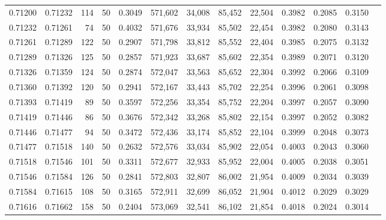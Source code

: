 \begin{tabular}{rrrrrrrrrrrrr}
0.71200 & 0.71232 &   114 &  50 &                                     0.3049 & 571,602 &  34,008 &  85,452 &  22,504 & 0.3982 & 0.2085 & 0.3150 \\
0.71232 & 0.71261 &    74 &  50 &                                     0.4032 & 571,676 &  33,934 &  85,502 &  22,454 & 0.3982 & 0.2080 & 0.3143 \\
0.71261 & 0.71289 &   122 &  50 &                                     0.2907 & 571,798 &  33,812 &  85,552 &  22,404 & 0.3985 & 0.2075 & 0.3132 \\
0.71289 & 0.71326 &   125 &  50 &                                     0.2857 & 571,923 &  33,687 &  85,602 &  22,354 & 0.3989 & 0.2071 & 0.3120 \\
0.71326 & 0.71359 &   124 &  50 &                                     0.2874 & 572,047 &  33,563 &  85,652 &  22,304 & 0.3992 & 0.2066 & 0.3109 \\
0.71360 & 0.71392 &   120 &  50 &                                     0.2941 & 572,167 &  33,443 &  85,702 &  22,254 & 0.3996 & 0.2061 & 0.3098 \\
0.71393 & 0.71419 &    89 &  50 &                                     0.3597 & 572,256 &  33,354 &  85,752 &  22,204 & 0.3997 & 0.2057 & 0.3090 \\
0.71419 & 0.71446 &    86 &  50 &                                     0.3676 & 572,342 &  33,268 &  85,802 &  22,154 & 0.3997 & 0.2052 & 0.3082 \\
0.71446 & 0.71477 &    94 &  50 &                                     0.3472 & 572,436 &  33,174 &  85,852 &  22,104 & 0.3999 & 0.2048 & 0.3073 \\
0.71477 & 0.71518 &   140 &  50 &                                     0.2632 & 572,576 &  33,034 &  85,902 &  22,054 & 0.4003 & 0.2043 & 0.3060 \\
0.71518 & 0.71546 &   101 &  50 &                                     0.3311 & 572,677 &  32,933 &  85,952 &  22,004 & 0.4005 & 0.2038 & 0.3051 \\
0.71546 & 0.71584 &   126 &  50 &                                     0.2841 & 572,803 &  32,807 &  86,002 &  21,954 & 0.4009 & 0.2034 & 0.3039 \\
0.71584 & 0.71615 &   108 &  50 &                                     0.3165 & 572,911 &  32,699 &  86,052 &  21,904 & 0.4012 & 0.2029 & 0.3029 \\
0.71616 & 0.71662 &   158 &  50 &                                     0.2404 & 573,069 &  32,541 &  86,102 &  21,854 & 0.4018 & 0.2024 & 0.3014 \\

\end{tabular}
